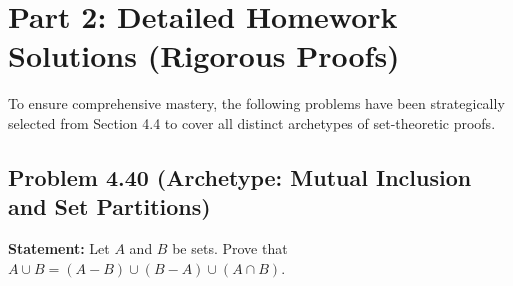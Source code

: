 \documentclass[11pt]{article}
\begin{document}
\section{Part 2: Detailed Homework Solutions (Rigorous Proofs)}

To ensure comprehensive mastery, the following problems have been strategically selected from Section 4.4 to cover all distinct archetypes of set-theoretic proofs.

\subsection{Problem 4.40 (Archetype: Mutual Inclusion and Set Partitions)}
\textbf{Statement:} Let $A$ and $B$ be sets. Prove that $A \cup B = (A - B) \cup (B - A) \cup (A \cap B)$.
\end{document}
